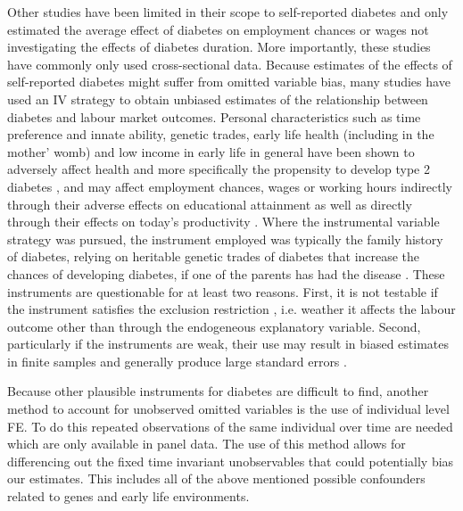 Other studies have been limited in their scope to self-reported diabetes
and only estimated the average effect of diabetes on employment chances
or wages not investigating the effects of diabetes duration. More
importantly, these studies have commonly only used cross-sectional
data. Because estimates of the effects of self-reported diabetes might
suffer from omitted variable bias, many studies have used an \ac{IV}
strategy to obtain unbiased estimates of the relationship between
diabetes and labour market outcomes. Personal characteristics such
as time preference and innate ability, genetic trades, early life
health (including in the mother' womb) and low income in early life
in general have been shown to adversely affect health and more specifically
the propensity to develop type 2 diabetes \citep{VanEwijk2011a,Sotomayor2013,Li2010b},
and may affect employment chances, wages or working hours indirectly
through their adverse effects on educational attainment \citep{Ayyagari2011b}
as well as directly through their effects on today's productivity
\citep{Currie2013}. Where the instrumental variable strategy was
pursued, the instrument employed was typically the family history
of diabetes, relying on heritable genetic trades of diabetes that
increase the chances of developing diabetes, if one of the parents
has had the disease \citep{Brown2005,Latif2009,Minor2010a,Lin2011b,Seuring2015}.
These instruments are questionable for at least two reasons. First,
it is not testable if the instrument satisfies the exclusion restriction
 , i.e. weather it affects the labour outcome other than through
the endogeneous explanatory variable. Second, particularly if the
instruments are weak, their use may result in biased estimates in
finite samples and generally produce large standard errors \citep{Bound1995}.

Because other plausible instruments for diabetes are difficult to
find, another method to account for unobserved omitted variables is
the use of individual level \ac{FE}. To do this repeated observations
of the same individual over time are needed which are only available
in panel data. The use of this method allows for differencing out
the fixed time invariant unobservables that could potentially bias
our estimates. This includes all of the above mentioned possible confounders
related to genes and early life environments.

